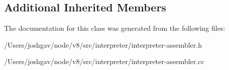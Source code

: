 \subsection*{Additional Inherited Members}


The documentation for this class was generated from the following files\+:\begin{DoxyCompactItemize}
\item 
/\+Users/joshgav/node/v8/src/interpreter/interpreter-\/assembler.\+h\item 
/\+Users/joshgav/node/v8/src/interpreter/interpreter-\/assembler.\+cc\end{DoxyCompactItemize}
